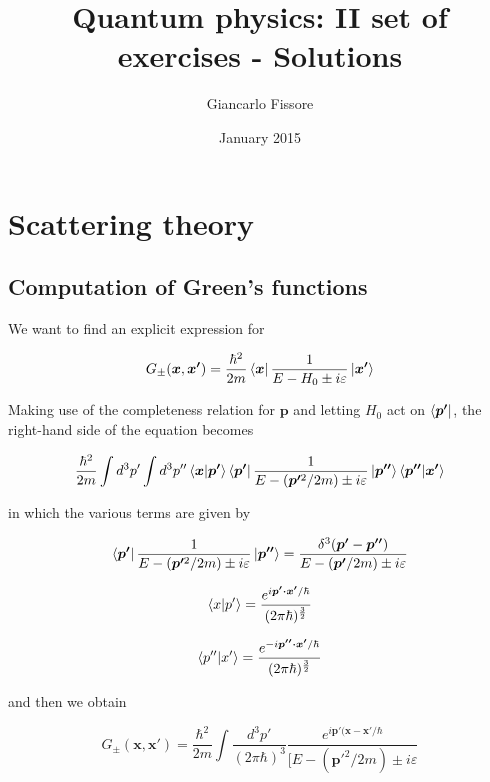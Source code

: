 \documentclass{article}
\begin{document}
\title{Quantum physics: II set of exercises - Solutions}
\author{Giancarlo Fissore}
\date{January 2015}
\maketitle

\section{Scattering theory}

\subsection{Computation of Green's functions}

We want to find an explicit expression for

\begin{equation}
G_{\pm}(\bm{x},\bm{x'}) = \frac{\hbar^2}{2m} \bra{\bm{x}} \frac{1}{E - H_0 \pm i\varepsilon} \ket{\bm{x'}}
\end{equation}

Making use of the completeness relation for \( \bm{p} \) and letting \( H_0 \) act on \( \bra{\bm{p'}} \), the right-hand side of the equation becomes

\begin{equation}
\frac{\hbar^2}{2m} \int d^3p' \int d^3p'' \braket{\bm{x}}{\bm{p'}} \bra{\bm{p'}} \frac{1}{E - (\bm{p'}^2/2m) \pm i\varepsilon} \ket{\bm{p''}} \braket{\bm{p''}}{\bm{x'}}
\end{equation}

in which the various terms are given by

\begin{equation}
\bra{\bm{p'}} \frac{1}{E - (\bm{p'}^2/2m) \pm i\varepsilon} \ket{\bm{p''}} = \frac{\delta^3(\bm{p'}-\bm{p''})}{E - (\bm{p'}/2m) \pm i \varepsilon}
\end{equation}

\begin{equation}
\braket{x}{p'} = \frac{e^{i\bm{p' \cdot x'}/\hbar}}{(2\pi\hbar)^{\frac{3}{2}}}
\end{equation}

\begin{equation}
\braket{p''}{x'} = \frac{e^{-i\bm{p'' \cdot x'}/\hbar}}{(2\pi\hbar)^{\frac{3}{2}}}
\end{equation}

and then we obtain

\begin{equation}
G_{\pm}(\bm{x},\bm{x'}) = \frac{\hbar^2}{2m} \int \frac{d^3p'}{(2\pi\hbar)^3} \frac{e^{i\bm{p'}(\bm{x}-\bm{x'}/\hbar}}{[E - (\bm{p'}^2/2m) \pm i \varepsilon}
\end{equation}
\end{document}
